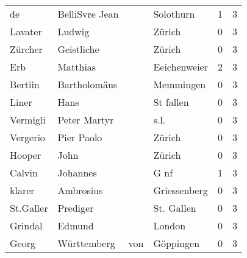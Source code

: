 \begin{tabular}{llllrr}
                       de &                     BelliSvre Jean &             &                                   Solothurn &          1 &         3 \\
                  Lavater &                             Ludwig &             &                                      Zürich &          0 &         3 \\
                  Zürcher &                         Geistliche &             &                                      Zürich &          0 &         3 \\
                      Erb &                           Matthias &             &                                Eeichenweier &          2 &         3 \\
                  Bertiin &                       Bartholomäus &             &                                   Memmingen &          0 &         3 \\
                    Liner &                               Hans &             &                                   St fallen &          0 &         3 \\
                 Vermigli &                       Peter Martyr &             &                                        s.l. &          0 &         3 \\
                 Vergerio &                         Pier Paolo &             &                                      Zürich &          0 &         3 \\
                   Hooper &                               John &             &                                      Zürich &          0 &         3 \\
                   Calvin &                           Johannes &             &                                        G nf &          1 &         3 \\
                   klarer &                          Ambrosius &             &                                Griessenberg &          0 &         3 \\
                St.Galler &                           Prediger &             &                                  St. Gallen &          0 &         3 \\
                  Grindal &                             Edmund &             &                                      London &          0 &         3 \\
                    Georg &                        Württemberg &         von &                                   Göppingen &          0 &         3 \\

\end{tabular}
